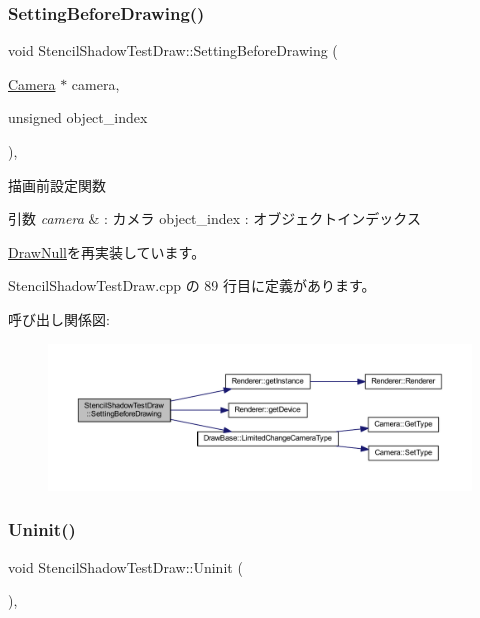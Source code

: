 \subsubsection{\texorpdfstring{Setting\+Before\+Drawing()}{SettingBeforeDrawing()}}
{\footnotesize\ttfamily void Stencil\+Shadow\+Test\+Draw\+::\+Setting\+Before\+Drawing (\begin{DoxyParamCaption}\item[{\mbox{\hyperlink{class_camera}{Camera}} $\ast$}]{camera,  }\item[{unsigned}]{object\+\_\+index }\end{DoxyParamCaption})\hspace{0.3cm}{\ttfamily [override]}, {\ttfamily [virtual]}}



描画前設定関数 


\begin{DoxyParams}{引数}
{\em camera} & \+: カメラ object\+\_\+index \+: オブジェクトインデックス \\
\hline
\end{DoxyParams}


\mbox{\hyperlink{class_draw_null_a7f0d52c5c2fb2d9b8eb423f363862290}{Draw\+Null}}を再実装しています。



 Stencil\+Shadow\+Test\+Draw.\+cpp の 89 行目に定義があります。

呼び出し関係図\+:
\nopagebreak
\begin{figure}[H]
\begin{center}
\leavevmode
\includegraphics[width=350pt]{class_stencil_shadow_test_draw_a0f697b6dad67048c7f8916a53cca6b1c_cgraph}
\end{center}
\end{figure}
\mbox{\label{class_stencil_shadow_test_draw_ad0672bf4ecfc8091cf54ed6f2c76b618}} 
\subsubsection{\texorpdfstring{Uninit()}{Uninit()}}
{\footnotesize\ttfamily void Stencil\+Shadow\+Test\+Draw\+::\+Uninit (\begin{DoxyParamCaption}{ }\end{DoxyParamCaption})\hspace{0.3cm}{\ttfamily [override]}, {\ttfamily [virtual]}}



